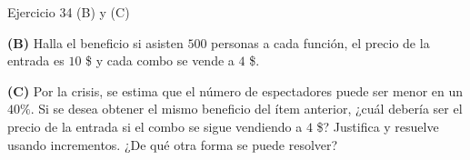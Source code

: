 \documentclass[aspectratio=169]{beamer}
\begin{document}
\begin{frame}{Ejercicio 34 (B) y (C)}
  \begin{mwejercicio}
    \textbf{(B)} Halla el beneficio si asisten \(500\) personas a cada función,
    el precio de la entrada es \(10\) \$ y cada combo se vende a \(4\) \$.

    \textbf{(C)} Por la crisis, se estima que el número de espectadores puede
    ser menor en un \(40\%\). Si se desea obtener el mismo beneficio del ítem
    anterior, ¿cuál debería ser el precio de la entrada si el combo se sigue
    vendiendo a \(4\) \$? Justifica y resuelve usando incrementos. ¿De qué otra
    forma se puede resolver?
  \end{mwejercicio}
\end{frame}
\end{document}
